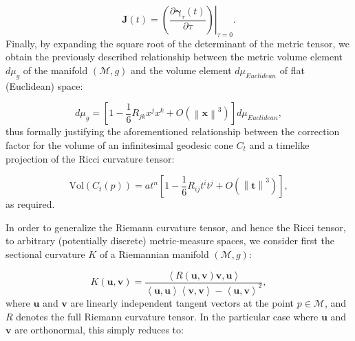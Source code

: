 \documentclass{article}
\begin{document}
\begin{equation}
\mathbf{J} \left( t \right) = \left. \left( \frac{\partial \boldsymbol\gamma_{\tau} \left( t \right)}{\partial \tau} \right) \right\rvert_{\tau = 0}.
\end{equation}
Finally, by expanding the square root of the determinant of the metric tensor, we obtain the previously described relationship between the metric volume element ${d \mu_g}$ of the manifold ${\left( \mathcal{M}, g \right)}$ and the volume element ${d \mu_{Euclidean}}$ of flat (Euclidean) space:

\begin{equation}
d \mu_g = \left[ 1 - \frac{1}{6} R_{j k} x^j x^k + O \left( \left\lVert \mathbf{x} \right\rVert^3 \right) \right] d \mu_{Euclidean},
\end{equation}
thus formally justifying the aforementioned relationship between the correction factor for the volume of an infinitesimal geodesic cone ${C_t}$ and a timelike projection of the Ricci curvature tensor:

\begin{equation}
\mathrm{Vol} \left( C_t \left( p \right) \right) = at^n \left[ 1 - \frac{1}{6} R_{i j} t^i t^j + O \left( \left\lVert \mathbf{t} \right\rVert^3 \right) \right],
\end{equation}
as required.

In order to generalize the Riemann curvature tensor, and hence the Ricci tensor, to arbitrary (potentially discrete) metric-measure spaces, we consider first the sectional curvature $K$ of a Riemannian manifold ${\left( \mathcal{M}, g \right)}$:

\begin{equation}
K \left( \mathbf{u}, \mathbf{v} \right) = \frac{\left\langle R \left( \mathbf{u}, \mathbf{v} \right) \mathbf{v}, \mathbf{u} \right\rangle}{\left\langle \mathbf{u}, \mathbf{u} \right\rangle \left\langle \mathbf{v}, \mathbf{v} \right\rangle - \left\langle \mathbf{u}, \mathbf{v} \right\rangle^2},
\end{equation}
where ${\mathbf{u}}$ and ${\mathbf{v}}$ are linearly independent tangent vectors at the point ${p \in \mathcal{M}}$, and $R$ denotes the full Riemann curvature tensor. In the particular case where ${\mathbf{u}}$ and ${\mathbf{v}}$ are orthonormal, this simply reduces to:
\end{document}
